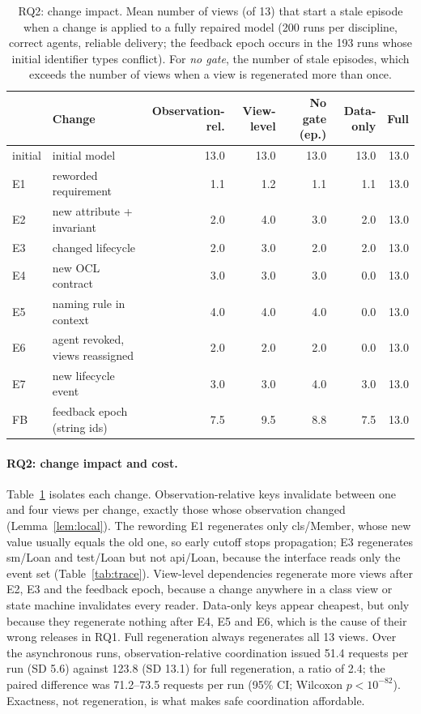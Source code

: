 \documentclass[pdflatex,sn-mathphys-num]{sn-jnl}
\theoremstyle{thmstyleone}%
\theoremstyle{thmstyletwo}%
\theoremstyle{thmstylethree}%
\newcommand{\vw}[1]{\textsf{#1}}
\newcommand{\SimExactRequests}{51.4}
\newcommand{\SimFullRequests}{123.8}
\newcommand{\SimFullRatio}{2.4}
\newcommand{\SimExactSd}{5.6}
\newcommand{\SimFullSd}{13.1}
\newcommand{\SimFullDiffLo}{71.2}
\newcommand{\SimFullDiffHi}{73.5}
\newcommand{\SimFullPexp}{-82}
\begin{document}
\begin{table}[!ht]
\caption{RQ2: change impact. Mean number of views (of 13) that start a stale episode when a change is applied to a fully repaired model (200 runs per discipline, correct agents, reliable delivery; the feedback epoch occurs in the 193 runs whose initial identifier types conflict). For \emph{no gate}, the number of stale episodes, which exceeds the number of views when a view is regenerated more than once.}\label{tab:impact}
\footnotesize\setlength{\tabcolsep}{4pt}
\begin{tabular}{@{}llrrrrr@{}}\toprule
 & Change & Observation-rel. & View-level & No gate (ep.) & Data-only & Full\\\midrule
initial & initial model & 13.0 & 13.0 & 13.0 & 13.0 & 13.0 \\
E1 & reworded requirement & 1.1 & 1.2 & 1.1 & 1.1 & 13.0 \\
E2 & new attribute + invariant & 2.0 & 4.0 & 3.0 & 2.0 & 13.0 \\
E3 & changed lifecycle & 2.0 & 3.0 & 2.0 & 2.0 & 13.0 \\
E4 & new OCL contract & 3.0 & 3.0 & 3.0 & 0.0 & 13.0 \\
E5 & naming rule in context & 4.0 & 4.0 & 4.0 & 0.0 & 13.0 \\
E6 & agent revoked, views reassigned & 2.0 & 2.0 & 2.0 & 0.0 & 13.0 \\
E7 & new lifecycle event & 3.0 & 3.0 & 4.0 & 3.0 & 13.0 \\
FB & feedback epoch (string ids) & 7.5 & 9.5 & 8.8 & 7.5 & 13.0 \\
\bottomrule
\end{tabular}
\end{table}

\paragraph{RQ2: change impact and cost.} Table~\ref{tab:impact} isolates each change. Observation-relative keys invalidate between one and four views per change, exactly those whose observation changed (Lemma~\ref{lem:local}). The rewording E1 regenerates only \vw{cls/Member}, whose new value usually equals the old one, so early cutoff stops propagation; E3 regenerates \vw{sm/Loan} and \vw{test/Loan} but not \vw{api/Loan}, because the interface reads only the event set (Table~\ref{tab:trace}). View-level dependencies regenerate more views after E2, E3 and the feedback epoch, because a change anywhere in a class view or state machine invalidates every reader. Data-only keys appear cheapest, but only because they regenerate nothing after E4, E5 and E6, which is the cause of their wrong releases in RQ1. Full regeneration always regenerates all 13 views. Over the asynchronous runs, observation-relative coordination issued \SimExactRequests{} requests per run (SD \SimExactSd) against \SimFullRequests{} (SD \SimFullSd) for full regeneration, a ratio of \SimFullRatio{}; the paired difference was \SimFullDiffLo--\SimFullDiffHi{} requests per run (95\% CI; Wilcoxon $p<10^{\SimFullPexp}$). Exactness, not regeneration, is what makes safe coordination affordable.
\end{document}

